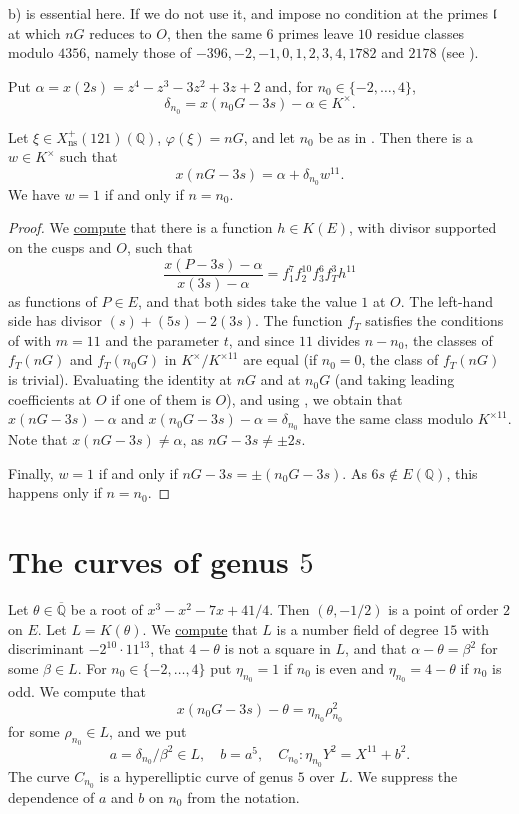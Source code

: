 \documentclass[11pt,reqno]{amsart}
\newcommand{\Q}{\mathbb{Q}}
\newcommand{\Qbar}{\overline{\Q}}
\newcommand{\fl}{\mathfrak{l}}
\newcommand{\ns}{\mathrm{ns}}
\newcommand{\Xns}[1]{X_{\ns}^+(#1)}
\newcommand{\repocommit}{c12c8c3705ed0b6b52254df69bd5ffe84542d568}
\newcommand{\gitlink}[2]{\href{https://github.com/F-Najman/Xns-121-/blob/\repocommit/#1}{#2}}
\newcommand{\githubbare}[1]{\href{https://github.com/F-Najman/Xns-121-/blob/\repocommit/#1}{\path{#1}}}
\theoremstyle{definition}
\numberwithin{equation}{section}
\begin{document}
\begin{remark}
 b) is essential here. If we do not use it, and impose no condition at the primes $\fl$ at which $nG$ reduces to $O$, then the same $6$ primes leave $10$ residue classes modulo $4356$, namely those of $-396,-2,-1,0,1,2,3,4,1782$ and $2178$ (see \githubbare{code/sieve_bruteforce.m}).
\end{remark}

Put $\alpha=x(2s)=z^4-z^3-3z^2+3z+2$ and, for $n_0\in\{-2,\ldots,4\}$,
$$\delta_{n_0}=x(n_0G-3s)-\alpha\in K^\times.$$

\begin{corollary}\label{cor:descent}
Let $\xi\in \Xns{121}(\Q)$, $\varphi(\xi)=nG$, and let $n_0$ be as in . Then there is a $w\in K^\times$ such that
\begin{equation}\label{eq:descent}
x(nG-3s)=\alpha+\delta_{n_0}w^{11}.
\end{equation}
We have $w=1$ if and only if $n=n_0$.
\end{corollary}

\begin{proof}
We \gitlink{code/setup.m}{compute} that there is a function $h\in K(E)$, with divisor supported on the cusps and $O$, such that
$$\frac{x(P-3s)-\alpha}{x(3s)-\alpha}=f_1^7f_2^{10}f_3^6f_T^3h^{11}$$
as functions of $P\in E$, and that both sides take the value $1$ at $O$. The left-hand side has divisor $(s)+(5s)-2(3s)$. The function $f_T$ satisfies the conditions of  with $m=11$ and the parameter $t$, and since $11$ divides $n-n_0$, the classes of $f_T(nG)$ and $f_T(n_0G)$ in $K^\times/K^{\times 11}$ are equal (if $n_0=0$, the class of $f_T(nG)$ is trivial). Evaluating the identity at $nG$ and at $n_0G$ (and taking leading coefficients at $O$ if one of them is $O$), and using , we obtain that $x(nG-3s)-\alpha$ and $x(n_0G-3s)-\alpha=\delta_{n_0}$ have the same class modulo $K^{\times 11}$. Note that $x(nG-3s)\neq \alpha$, as $nG-3s\neq \pm 2s$.

Finally, $w=1$ if and only if $nG-3s=\pm(n_0G-3s)$. As $6s\notin E(\Q)$, this happens only if $n=n_0$.
\end{proof}

\section{The curves of genus \texorpdfstring{$5$}{5}}\label{sec:genus5}

Let $\theta\in\Qbar$ be a root of $x^3-x^2-7x+41/4$. Then $(\theta,-1/2)$ is a point of order $2$ on $E$. Let $L=K(\theta)$. We \gitlink{code/setup.m}{compute} that $L$ is a number field of degree $15$ with discriminant $-2^{10}\cdot 11^{13}$, that $4-\theta$ is not a square in $L$, and that $\alpha-\theta=\beta^2$ for some $\beta\in L$. For $n_0\in\{-2,\ldots,4\}$ put $\eta_{n_0}=1$ if $n_0$ is even and $\eta_{n_0}=4-\theta$ if $n_0$ is odd. We compute that
$$x(n_0G-3s)-\theta=\eta_{n_0}\rho_{n_0}^2$$
for some $\rho_{n_0}\in L$, and we put
$$a=\delta_{n_0}/\beta^2\in L, \quad b=a^5, \quad C_{n_0}\colon \eta_{n_0}Y^2=X^{11}+b^2.$$
The curve $C_{n_0}$ is a hyperelliptic curve of genus $5$ over $L$. We suppress the dependence of $a$ and $b$ on $n_0$ from the notation.
\end{document}
